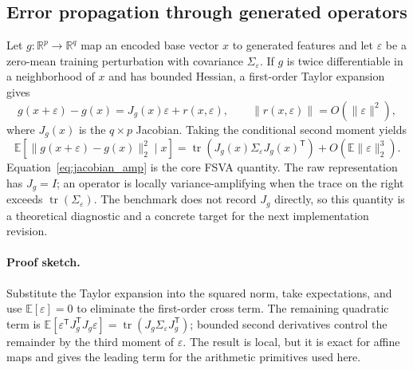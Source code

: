 \documentclass[preprint,12pt]{elsarticle}
\begin{document}
\subsection{Error propagation through generated operators}
Let $g:\mathbb{R}^{p}\rightarrow\mathbb{R}^{q}$ map an encoded base vector $x$ to generated features and let $\varepsilon$ be a zero-mean training perturbation with covariance $\Sigma_{\varepsilon}$.  If $g$ is twice differentiable in a neighborhood of $x$ and has bounded Hessian, a first-order Taylor expansion gives
\begin{equation}
  g(x+\varepsilon)-g(x)=J_g(x)\varepsilon+r(x,\varepsilon),
  \qquad \|r(x,\varepsilon)\|=O(\|\varepsilon\|^2),
\end{equation}
where $J_g(x)$ is the $q\times p$ Jacobian.  Taking the conditional second moment yields
\begin{equation}
  \mathbb{E}\!\left[\|g(x+\varepsilon)-g(x)\|_2^2\mid x\right]
  =\operatorname{tr}\!\left(J_g(x)\Sigma_{\varepsilon}J_g(x)^{\mathsf T}\right)
  +O\!\left(\mathbb{E}\|\varepsilon\|_2^3\right).
  \label{eq:jacobian_amp}
\end{equation}
Equation~\eqref{eq:jacobian_amp} is the core FSVA quantity.  The raw representation has $J_g=I$; an operator is locally variance-amplifying when the trace on the right exceeds $\operatorname{tr}(\Sigma_{\varepsilon})$.  The benchmark does not record $J_g$ directly, so this quantity is a theoretical diagnostic and a concrete target for the next implementation revision.

\paragraph{Proof sketch.} Substitute the Taylor expansion into the squared norm, take expectations, and use $\mathbb{E}[\varepsilon]=0$ to eliminate the first-order cross term.  The remaining quadratic term is $\mathbb{E}[\varepsilon^{\mathsf T}J_g^{\mathsf T}J_g\varepsilon]=\operatorname{tr}(J_g\Sigma_{\varepsilon}J_g^{\mathsf T})$; bounded second derivatives control the remainder by the third moment of $\varepsilon$.  The result is local, but it is exact for affine maps and gives the leading term for the arithmetic primitives used here.
\end{document}
